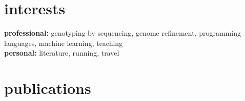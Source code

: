 \documentclass[]{friggeri-cv} %
\begin{document}
\section{interests}

\textbf{professional:} genotyping by sequencing, genome refinement, programming languages, machine learning, teaching \\ \textbf{personal:} literature, running, travel


\section{publications}





\end{document}
